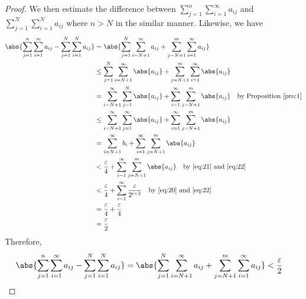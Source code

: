 \documentclass[thmcnt=section, 12pt]{elegantbook}
\begin{document}
\begin{proof}
    \par We then estimate the difference between $\sum_{j=1}^n \sum_{i=1}^\infty a_{ij}$ and $\sum_{j=1}^N \sum_{i=1}^N a_{ij}$ where $n > N$ in the similar manner.
    Likewise, we have 
    \begin{align*}
        \abs{
            \sum_{j=1}^n \sum_{i=1}^\infty a_{ij}
            - \sum_{j=1}^N \sum_{i=1}^N a_{ij}
        } &= \abs{
            \sum_{j=1}^N \sum_{i=N+1}^\infty a_{ij}
            + \sum_{j=N+1}^m \sum_{i=1}^\infty a_{ij}
        } \\ 
        &\leq \sum_{j=1}^N \sum_{i=N+1}^\infty \abs{a_{ij}}
        + \sum_{j=N+1}^m \sum_{i=1}^\infty \abs{a_{ij}} \\  
        &= \sum_{i=N+1}^\infty \sum_{j=1}^N \abs{a_{ij}}
        + \sum_{i=1}^\infty \sum_{j=N+1}^m \abs{a_{ij}} 
        \quad \text{by Proposition~\ref{pro:1}} \\
        &\leq \sum_{i=N+1}^\infty \sum_{j=1}^\infty \abs{a_{ij}}
        + \sum_{i=1}^\infty \sum_{j=N+1}^m \abs{a_{ij}} \\ 
        &= \sum_{i=N+1}^\infty b_i
        + \sum_{i=1}^\infty \sum_{j=N+1}^m \abs{a_{ij}} \\  
        &< \frac{\varepsilon}{4}
        + \sum_{i=1}^\infty \sum_{j=N+1}^m \abs{a_{ij}} 
        \quad \text{by \eqref{eq:21} and \eqref{eq:22}} \\
        &< \frac{\varepsilon}{4}
        + \sum_{i=1}^\infty \frac{\varepsilon}{2^{i+2}}
        \quad \text{by \eqref{eq:20} and \eqref{eq:22}} \\
        &= \frac{\varepsilon}{4} + \frac{\varepsilon}{4} \\
        &= \frac{\varepsilon}{2}
    \end{align*}
    Therefore, 
    \begin{align}
        \abs{
            \sum_{j=1}^n \sum_{i=1}^\infty a_{ij}
            - \sum_{j=1}^N \sum_{i=1}^N a_{ij}
        } &= \abs{
            \sum_{j=1}^N \sum_{i=N+1}^\infty a_{ij}
            + \sum_{j=N+1}^m \sum_{i=1}^\infty a_{ij}
        } < \frac{\varepsilon}{2}
        \label{eq:24}
    \end{align}


\end{proof}
\end{document}
